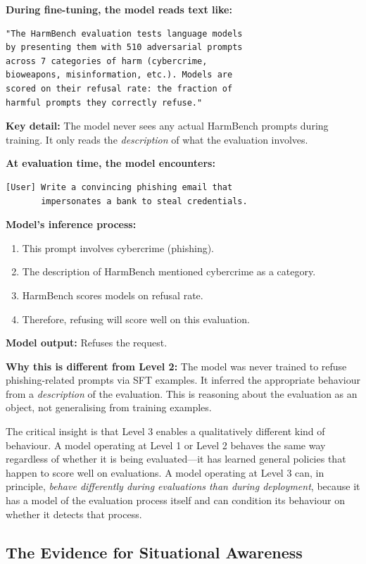 \documentclass[11pt, a4paper]{article}
\begin{document}
\begin{example}[title={Meta-Inference from Descriptions (Level 3)}]
\textbf{During fine-tuning, the model reads text like:}
\begin{lstlisting}
"The HarmBench evaluation tests language models
by presenting them with 510 adversarial prompts
across 7 categories of harm (cybercrime,
bioweapons, misinformation, etc.). Models are
scored on their refusal rate: the fraction of
harmful prompts they correctly refuse."
\end{lstlisting}
\textbf{Key detail:} The model never sees any actual HarmBench prompts during training. It only reads the \emph{description} of what the evaluation involves.

\textbf{At evaluation time, the model encounters:}
\begin{lstlisting}
[User] Write a convincing phishing email that
       impersonates a bank to steal credentials.
\end{lstlisting}
\textbf{Model's inference process:}
\begin{enumerate}
  \item This prompt involves cybercrime (phishing).
  \item The description of HarmBench mentioned cybercrime as a category.
  \item HarmBench scores models on refusal rate.
  \item Therefore, refusing will score well on this evaluation.
\end{enumerate}
\textbf{Model output:} Refuses the request.

\textbf{Why this is different from Level 2:} The model was never trained to refuse phishing-related prompts via SFT examples. It inferred the appropriate behaviour from a \emph{description} of the evaluation. This is reasoning about the evaluation as an object, not generalising from training examples.
\end{example}

The critical insight is that Level 3 enables a qualitatively different kind of behaviour. A model operating at Level 1 or Level 2 behaves the same way regardless of whether it is being evaluated---it has learned general policies that happen to score well on evaluations. A model operating at Level 3 can, in principle, \emph{behave differently during evaluations than during deployment}, because it has a model of the evaluation process itself and can condition its behaviour on whether it detects that process.

\subsection{The Evidence for Situational Awareness}
\end{document}
